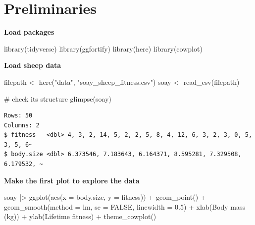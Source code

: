 \documentclass[
  letterpaper,
  DIV=11,
  numbers=noendperiod]{scrreprt}
\newenvironment{Shaded}{\begin{snugshade}}{\end{snugshade}}
\newcommand{\AttributeTok}[1]{\textcolor[rgb]{0.40,0.45,0.13}{#1}}
\newcommand{\CommentTok}[1]{\textcolor[rgb]{0.37,0.37,0.37}{#1}}
\newcommand{\ConstantTok}[1]{\textcolor[rgb]{0.56,0.35,0.01}{#1}}
\newcommand{\FloatTok}[1]{\textcolor[rgb]{0.68,0.00,0.00}{#1}}
\newcommand{\FunctionTok}[1]{\textcolor[rgb]{0.28,0.35,0.67}{#1}}
\newcommand{\NormalTok}[1]{\textcolor[rgb]{0.00,0.23,0.31}{#1}}
\newcommand{\OtherTok}[1]{\textcolor[rgb]{0.00,0.23,0.31}{#1}}
\newcommand{\SpecialCharTok}[1]{\textcolor[rgb]{0.37,0.37,0.37}{#1}}
\newcommand{\StringTok}[1]{\textcolor[rgb]{0.13,0.47,0.30}{#1}}
\begin{document}
\section{Preliminaries}\label{preliminaries-2}

\textbf{Load packages}

\begin{Shaded}
\begin{Highlighting}[]
\FunctionTok{library}\NormalTok{(tidyverse)}
\FunctionTok{library}\NormalTok{(ggfortify) }
\FunctionTok{library}\NormalTok{(here)}
\FunctionTok{library}\NormalTok{(cowplot)}
\end{Highlighting}
\end{Shaded}

\textbf{Load sheep data}

\begin{Shaded}
\begin{Highlighting}[]
\NormalTok{filepath }\OtherTok{\textless{}{-}} \FunctionTok{here}\NormalTok{(}\StringTok{"data"}\NormalTok{, }\StringTok{"soay\_sheep\_fitness.csv"}\NormalTok{)}
\NormalTok{soay }\OtherTok{\textless{}{-}} \FunctionTok{read\_csv}\NormalTok{(filepath)}

\CommentTok{\# check its structure}
\FunctionTok{glimpse}\NormalTok{(soay)}
\end{Highlighting}
\end{Shaded}

\begin{verbatim}
Rows: 50
Columns: 2
$ fitness   <dbl> 4, 3, 2, 14, 5, 2, 2, 5, 8, 4, 12, 6, 3, 2, 3, 0, 5, 3, 5, 6~
$ body.size <dbl> 6.373546, 7.183643, 6.164371, 8.595281, 7.329508, 6.179532, ~
\end{verbatim}

\textbf{Make the first plot to explore the data}

\begin{Shaded}
\begin{Highlighting}[]
\NormalTok{soay }\SpecialCharTok{|\textgreater{}}
 \FunctionTok{ggplot}\NormalTok{(}\FunctionTok{aes}\NormalTok{(}\AttributeTok{x =}\NormalTok{ body.size, }\AttributeTok{y =}\NormalTok{ fitness)) }\SpecialCharTok{+}
 \FunctionTok{geom\_point}\NormalTok{() }\SpecialCharTok{+}
 \FunctionTok{geom\_smooth}\NormalTok{(}\AttributeTok{method =} \StringTok{\textquotesingle{}lm\textquotesingle{}}\NormalTok{, }\AttributeTok{se =} \ConstantTok{FALSE}\NormalTok{, }\AttributeTok{linewidth =} \FloatTok{0.5}\NormalTok{) }\SpecialCharTok{+}
 \FunctionTok{xlab}\NormalTok{(}\StringTok{\textquotesingle{}Body mass (kg)\textquotesingle{}}\NormalTok{) }\SpecialCharTok{+}
 \FunctionTok{ylab}\NormalTok{(}\StringTok{\textquotesingle{}Lifetime fitness\textquotesingle{}}\NormalTok{) }\SpecialCharTok{+}
 \FunctionTok{theme\_cowplot}\NormalTok{()}
\end{Highlighting}
\end{Shaded}
\end{document}
